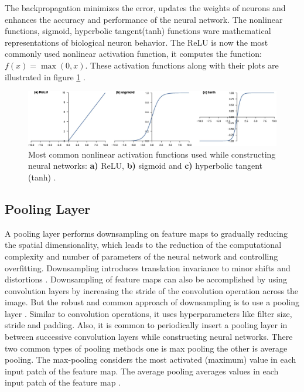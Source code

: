 The backpropagation minimizes the error, updates the weights of neurons and enhances the accuracy and performance of the neural network. The nonlinear functions, sigmoid, hyperbolic tangent(tanh) functions ware mathematical representations of biological neuron behavior. The \ac{ReLU} is now the most commonly used nonlinear activation function, it computes the function: $f(x) = \max(0, x)$. These activation functions along with their plots are illustrated in figure \ref{fig:ActivationFunctions} \cite{LeCun.2015} \cite{NIPS2012_c399862d}.





\vspace*{0.5cm}

\begin{figure}[H]
        \begin{center}
	    \includegraphics[scale=0.42]{images/Fundamentals/ActivationFunctions.jpg}
	    \caption[Most common nonlinear activation functions used while constructing Neural Networks.]{Most common nonlinear activation functions used while constructing neural networks: \textbf{a)} \ac{ReLU}, \textbf{b)} sigmoid and \textbf{c)} hyperbolic tangent (tanh) \cite{articleCNNs}.}
	    \label{fig:ActivationFunctions}
	    \end{center}
\end{figure}

\subsection{Pooling Layer}\label{PoolingLayer}
A pooling layer performs downsampling on feature maps to gradually reducing the spatial dimensionality, which leads to the reduction of the computational complexity and number of parameters of the neural network and controlling overfitting. Downsampling introduces translation invariance to minor shifts and distortions \cite{goodfellow2017deep}. Downsampling of feature maps can also be accomplished by using convolution layers by increasing the stride of the convolution operation across the image. But the robust and common approach of downsampling is to use a pooling layer \cite{goodfellow2017deep}. Similar to convolution operations, it uses hyperparameters like filter size, stride and padding. Also, it is common to periodically insert a pooling layer in between successive convolution layers while constructing neural networks. There two common types of pooling methods one is max pooling the other is average pooling. The max-pooling considers the most activated (maximum) value in each input patch of the feature map. The average pooling averages values in each input patch of the feature map \cite{10.1007/978-3-642-15825-4_10}.

